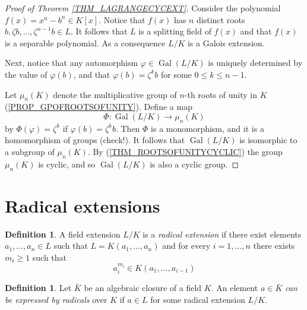 \documentclass[12pt, letterpaper, oneside]{article}
\theoremstyle{plain}
\theoremstyle{definition}
\newtheorem{definition}[theorem]{Definition}
\newcommand{\Gal}{\operatorname{Gal}}
\newcommand{\vs}{\vskip 5mm}
\begin{document}
\begin{proof}[Proof of Theorem \ref{THM_LAGRANGECYCEXT}]
Consider the polynomial $f(x) = x^{n}-b^{n}\in K[x]$. Notice that $f(x)$ has $n$ distinct roots 
$b, \zeta b, \dots, \zeta^{n-1}b\in L$.  It follows that $L$ is a splitting field of $f(x)$ and that 
$f(x)$ is a separable polynomial. As a consequence $L/K$ is a Galois extension. 

Next, notice that any automorphism $\varphi\in \Gal(L/K)$ is uniquely determined by the 
value of $\varphi(b)$, and that $\varphi(b) = \zeta^{k} b$ for some $0\leq k \leq n-1$. 

Let $\mu_{n}(K)$ denote the multiplicative group of $n$-th roots of unity in $K$ 
(\ref{PROP_GPOFROOTSOFUNITY}). Define a map 
$$\Phi \colon \Gal(L/K) \to  \mu_{n}(K)$$
by $\Phi(\varphi) = \zeta^{k}$ if $\varphi(b) = \zeta^{k}b$. Then $\Phi$ is a monomorphism, 
and it is a homomorphism of groups (check!). It follows that $\Gal(L/K)$ is isomorphic
to a subgroup of $\mu_{n}(K)$. By (\ref{THM_ROOTSOFUNITYCYCLIC}) the group 
$\mu_{n}(K)$ is cyclic, and so $\Gal(L/K)$ is also a cyclic group. 

 


\end{proof}







\newpage
\section{Radical extensions}
\label{SEC_RADICALEXT}





\begin{definition}
A field extension $L/K$ is a \emph{radical extension}  if there exist elements 
$a_{1}, \dots, a_{n}\in L$ such that $L = K(a_{1}, \dots, a_{n})$ and for every $i=1, \dots, n$
there exists $m_{i}\geq 1$ such that 
$$a_{i}^{m_{i}}\in K(a_{1}, \dots, a_{i-1})$$  
\end{definition}

\vs\vs


\begin{definition}
Let $\bar{K}$ be an algebraic closure of a field $K$. An element $a\in \bar{K}$ 
\emph{can be expressed by radicals} over $K$ if $a\in L$ for some radical extension 
$L/K$. 
\end{definition}
\end{document}
